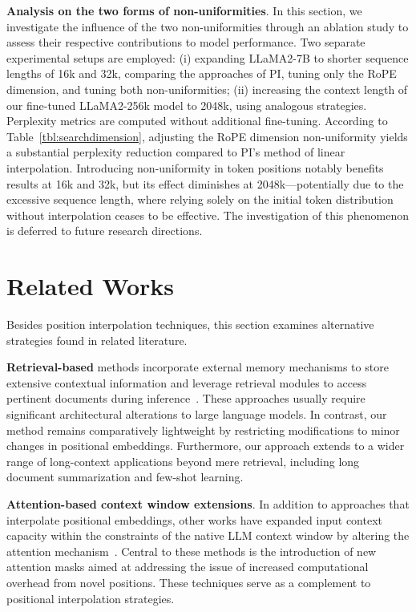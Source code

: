 \textbf{Analysis on the two forms of non-uniformities}. In this section, we investigate the influence of the two non-uniformities through an ablation study to assess their respective contributions to model performance. Two separate experimental setups are employed: (i) expanding LLaMA2-7B to shorter sequence lengths of 16k and 32k, comparing the approaches of PI, tuning only the RoPE dimension, and tuning both non-uniformities; (ii) increasing the context length of our fine-tuned LLaMA2-256k model to 2048k, using analogous strategies. Perplexity metrics are computed without additional fine-tuning. According to Table~\ref{tbl:searchdimension}, adjusting the RoPE dimension non-uniformity yields a substantial perplexity reduction compared to PI's method of linear interpolation. Introducing non-uniformity in token positions notably benefits results at 16k and 32k, but its effect diminishes at 2048k—potentially due to the excessive sequence length, where relying solely on the initial token distribution without interpolation ceases to be effective. The investigation of this phenomenon is deferred to future research directions.

\section{Related Works}

Besides position interpolation techniques, this section examines alternative strategies found in related literature.

\textbf{Retrieval-based} methods incorporate external memory mechanisms to store extensive contextual information and leverage retrieval modules to access pertinent documents during inference~\cite{longllama,wang2023augmenting,borgeaud2022improving}. These approaches usually require significant architectural alterations to large language models. In contrast, our method remains comparatively lightweight by restricting modifications to minor changes in positional embeddings. Furthermore, our approach extends to a wider range of long-context applications beyond mere retrieval, including long document summarization and few-shot learning.

\textbf{Attention-based context window extensions}. In addition to approaches that interpolate positional embeddings, other works have expanded input context capacity within the constraints of the native LLM context window by altering the attention mechanism~\cite{han2023lminfinite, streamingllm,parallelwindow}. Central to these methods is the introduction of new attention masks aimed at addressing the issue of increased computational overhead from novel positions. These techniques serve as a complement to positional interpolation strategies.

